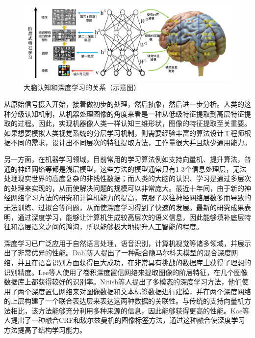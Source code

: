 \begin{figure}[tb]
\begin{center}
\includegraphics[width=0.9\linewidth]{figures/1-3.jpg} 
\end{center} 
\vspace{-4mm}
\caption{大脑认知和深度学习的关系（示意图）} \label{fig_brain}
\end{figure}

从原始信号摄入开始，接着做初步的处理，然后抽象，然后进一步分析。人类的这种分级认知机制，从机器处理图像的角度来看是一种从低级特征提取到高层特征提取的过程。因此，实现机器像人类一样认知三维形状，图像的特征提取至关重要。如果想要模拟人类视觉系统的分层学习机制，则需要经验丰富的算法设计工程师根据不同的需求，设计出不同层次的特征提取方法，工作量很大并且缺少通用能力。

另一方面，在机器学习领域，目前常用的学习算法例如支持向量机、提升算法，普通的神经网络等都是浅层模型，这些方法的模型通常只有1-3个信息处理层，无法处理现实世界的高度复杂的非线性数据；而人类的大脑的认识、学习是通过多层次的处理来实现的，从而使解决问题的规模可以非常庞大。最近十年间，由于新的神经网络学习方法的研究和计算机能力的提高，克服了以往神经网络层数多而导致的无法训练、过拟合等问题，从而使深度学习得到了快速的发展。最新的研究成果表明，通过深度学习，能够让计算机生成较高层次的语义信息，因此能够填补底层特征和高层语义之间的鸿沟，所以能够极大地提升人工智能的程度。

深度学习已广泛应用于自然语言处理，语音识别，计算机视觉等诸多领域，并展示出了非常优异的性能\cite{Krizhevsky2017ImageNet, He2015Delving, Mnih2015Human}。Dahl等人\cite{Dahl2012Context}提出了一种融合隐马尔科夫模型的混合深度网络，并且在语音识别方面获得巨大成功，在非常具有挑战的数据库上获得了理想的识别精度。Lee等人\cite{Honglak2009Convolutional}使用了卷积深度置信网络来提取图像的阶层特征，在几个图像数据库上都获得较好的识别率。Nitish等人\cite{Srivastava2012Multimodal}提出了多模态的深度学习方法，他们使用了两个深度置信网络来对图像数据和文本标签数据进行建模，并在两个深度网络的上层构建了一个联合表达层来表达这两种数据的关联性。与传统的支持向量机方法相比，该方法能够充分利用多种来源的信息，因此能够获得更高的性能。Kae等人\cite{Kae2013Augmenting}提出了一种融合CRF和玻尔兹曼机的图像标签方法，通过这种融合使深度学习方法提高了结构学习能力。

